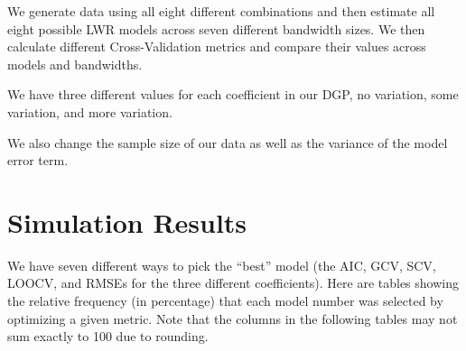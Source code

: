 \documentclass{article}\usepackage[]{graphicx}\usepackage[]{color}
\begin{document}
We generate data using all eight different combinations and then estimate all eight possible LWR models across seven different bandwidth sizes. We then calculate different Cross-Validation metrics and compare their values across models and bandwidths. 

We have three different values for each coefficient in our DGP, no variation, some variation, and more variation.

We also change the sample size of our data as well as the variance of the model error term.

\section{Simulation Results}

We have seven different ways to pick the ``best'' model (the AIC, GCV, SCV, LOOCV, and RMSEs for the three different coefficients). Here are tables showing the relative frequency (in percentage) that each model number was selected by optimizing a given metric. Note that the columns in the following tables may not sum exactly to 100 due to rounding.
\end{document}
